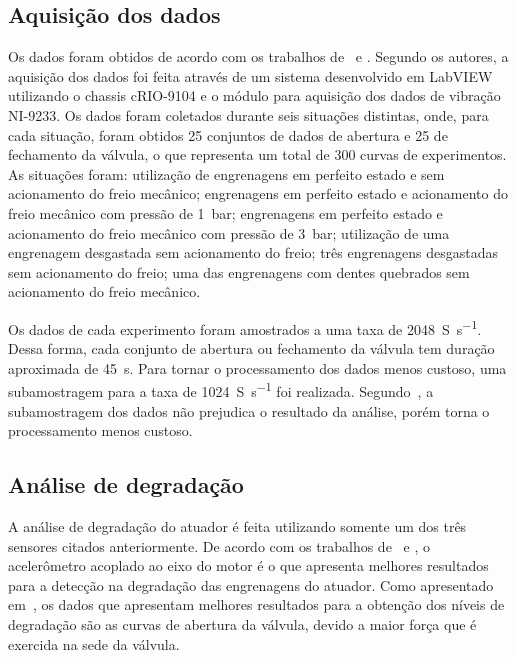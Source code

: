 \subsection{Aquisição dos dados}

Os dados foram obtidos de acordo com os trabalhos de~\cite{boesch2011deteccao} e
\cite{faccin2011manutencao}. Segundo os autores, a aquisição dos dados foi feita através de um
sistema desenvolvido em LabVIEW utilizando o chassis {cRIO-9104} e o módulo para aquisição dos dados
de vibração {NI-9233}. Os dados foram coletados durante seis situações distintas, onde, para cada
situação, foram obtidos \num{25} conjuntos de dados de abertura e \num{25} de fechamento da válvula,
o que representa um total de \num{300} curvas de experimentos. As situações foram: utilização de
engrenagens em perfeito estado e sem acionamento do freio mecânico; engrenagens em perfeito estado e
acionamento do freio mecânico com pressão de \SI{1}{\bar}; engrenagens em perfeito estado e
acionamento do freio mecânico com pressão de \SI{3}{\bar}; utilização de uma engrenagem desgastada
sem acionamento do freio; três engrenagens desgastadas sem acionamento do freio; uma das engrenagens
com dentes quebrados sem acionamento do freio mecânico.

Os dados de cada experimento foram amostrados a uma taxa de \SI{2048}{S\per\second}. Dessa forma,
cada conjunto de abertura ou fechamento da válvula tem duração aproximada de \SI{45}{\second}. Para
tornar o processamento dos dados menos custoso, uma subamostragem para a taxa de
\SI{1024}{S\per\second} foi realizada. Segundo~\cite{faccin2011manutencao}, a subamostragem dos
dados não prejudica o resultado da análise, porém torna o processamento menos custoso.


\subsection{Análise de degradação}

A análise de degradação do atuador é feita utilizando somente um dos três sensores citados
anteriormente. De acordo com os trabalhos de~\cite{boesch2011deteccao} e
\cite{faccin2011manutencao}, o acelerômetro acoplado ao eixo do motor é o que apresenta melhores
resultados para a detecção na degradação das engrenagens do atuador. Como apresentado
em~\cite{lazzaretti2012avaliacao}, os dados que apresentam melhores resultados para a obtenção dos
níveis de degradação são as curvas de abertura da válvula, devido a maior força que é exercida na
sede da válvula.

